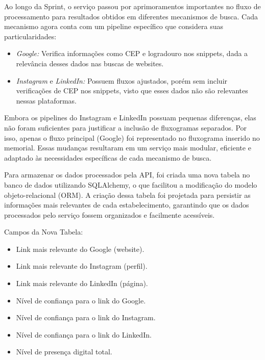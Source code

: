 \indent \originaltab{}Ao longo da Sprint, o serviço passou por aprimoramentos importantes no fluxo de processamento para resultados obtidos em diferentes mecanismos de busca. Cada mecanismo agora conta com um pipeline específico que considera suas particularidades:\par

\begin{itemize}
\item \textit{Google:} Verifica informações como CEP e logradouro nos snippets, dada a relevância desses dados nas buscas de websites.
\item \textit{Instagram} e \textit{LinkedIn:} Possuem fluxos ajustados, porém sem incluir verificações de CEP nos snippets, visto que esses dados não são relevantes nessas plataformas.
\end{itemize}

\indent Embora os pipelines do Instagram e LinkedIn possuam pequenas diferenças, elas não foram suficientes para justificar a inclusão de fluxogramas separados. Por isso, apenas o fluxo principal (Google) foi representado no fluxograma inserido no memorial. Essas mudanças resultaram em um serviço mais modular, eficiente e adaptado às necessidades específicas de cada mecanismo de busca.\par

\indent \originaltab{}Para armazenar os dados processados pela API, foi criada uma nova tabela no banco de dados utilizando SQLAlchemy, o que facilitou a modificação do modelo objeto-relacional (ORM). A criação dessa tabela foi projetada para persistir as informações mais relevantes de cada estabelecimento, garantindo que os dados processados pelo serviço fossem organizados e facilmente acessíveis.\par

\indent \originaltab{}Campos da Nova Tabela:\par

\begin{itemize}
\item Link mais relevante do Google (website).
\item Link mais relevante do Instagram (perfil).
\item Link mais relevante do LinkedIn (página).
\item Nível de confiança para o link do Google.
\item Nível de confiança para o link do Instagram.
\item Nível de confiança para o link do LinkedIn.
\item Nível de presença digital total.
\end{itemize}


